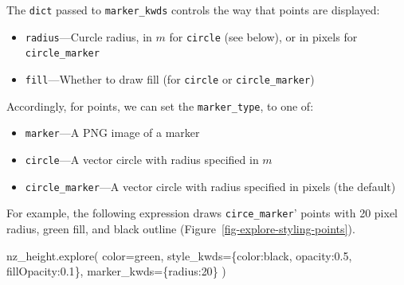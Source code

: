 \documentclass[
  letterpaper,
]{krantz}
\newenvironment{Shaded}{\begin{snugshade}}{\end{snugshade}}
\newcommand{\DecValTok}[1]{\textcolor[rgb]{0.68,0.00,0.00}{#1}}
\newcommand{\FloatTok}[1]{\textcolor[rgb]{0.68,0.00,0.00}{#1}}
\newcommand{\NormalTok}[1]{\textcolor[rgb]{0.00,0.23,0.31}{#1}}
\newcommand{\OperatorTok}[1]{\textcolor[rgb]{0.37,0.37,0.37}{#1}}
\newcommand{\StringTok}[1]{\textcolor[rgb]{0.13,0.47,0.30}{#1}}
\providecommand{\tightlist}{%
  \setlength{\itemsep}{0pt}\setlength{\parskip}{0pt}}\usepackage{longtable,booktabs,array}
\begin{document}
The \texttt{dict} passed to \texttt{marker\_kwds} controls the way that
points are displayed:

\begin{itemize}
\tightlist
\item
  \texttt{radius}---Curcle radius, in \(m\) for \texttt{circle} (see
  below), or in pixels for \texttt{circle\_marker}
\item
  \texttt{fill}---Whether to draw fill (for \texttt{circle} or
  \texttt{circle\_marker})
\end{itemize}

Accordingly, for points, we can set the \texttt{marker\_type}, to one
of:

\begin{itemize}
\tightlist
\item
  \texttt{\textquotesingle{}marker\textquotesingle{}}---A PNG image of a
  marker
\item
  \texttt{\textquotesingle{}circle\textquotesingle{}}---A vector circle
  with radius specified in \(m\)
\item
  \texttt{\textquotesingle{}circle\_marker\textquotesingle{}}---A vector
  circle with radius specified in pixels (the default)
\end{itemize}

For example, the following expression draws
\texttt{\textquotesingle{}circe\_marker}' points with 20 pixel radius,
green fill, and black outline (Figure~\ref{fig-explore-styling-points}).

\begin{Shaded}
\begin{Highlighting}[]
\NormalTok{nz\_height.explore(}
\NormalTok{    color}\OperatorTok{=}\StringTok{\textquotesingle{}green\textquotesingle{}}\NormalTok{, }
\NormalTok{    style\_kwds}\OperatorTok{=}\NormalTok{\{}\StringTok{\textquotesingle{}color\textquotesingle{}}\NormalTok{:}\StringTok{\textquotesingle{}black\textquotesingle{}}\NormalTok{, }\StringTok{\textquotesingle{}opacity\textquotesingle{}}\NormalTok{:}\FloatTok{0.5}\NormalTok{, }\StringTok{\textquotesingle{}fillOpacity\textquotesingle{}}\NormalTok{:}\FloatTok{0.1}\NormalTok{\}, }
\NormalTok{    marker\_kwds}\OperatorTok{=}\NormalTok{\{}\StringTok{\textquotesingle{}radius\textquotesingle{}}\NormalTok{:}\DecValTok{20}\NormalTok{\}}
\NormalTok{)}
\end{Highlighting}
\end{Shaded}
\end{document}
